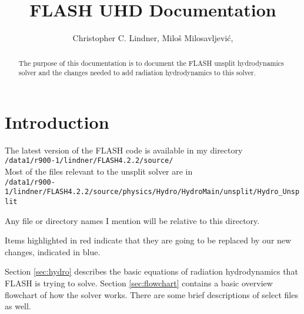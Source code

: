 \documentclass[preprint,11pt]{aastex}
\begin{document}
	

\title{FLASH UHD Documentation}
\author{
Christopher C. Lindner,
Milo\v s Milosavljevi\'c,
}


\begin{abstract}
The purpose of this documentation is to document the FLASH unsplit hydrodynamics solver and the changes needed to add radiation hydrodynamics to this solver.

\keywords{ }


\end{abstract}

\section{Introduction}
\label{sec:intro}
\setcounter{footnote}{0}

The latest version of the FLASH code is available in my directory \\
\verb!/data1/r900-1/lindner/FLASH4.2.2/source/! \\

Most of the files relevant to the unsplit solver are in \\
\verb!/data1/r900-1/lindner/FLASH4.2.2/source/physics/Hydro/HydroMain/unsplit/Hydro_Unsplit!

Any file or directory names I mention will be relative to this directory.

Items highlighted in {\color{red}red} indicate that they are going to be replaced by our new changes, indicated in {\color{blue}blue}.

Section \ref{sec:hydro} describes the basic equations of radiation hydrodynamics that FLASH is trying to solve.  Section \ref{sec:flowchart} contains a basic overview flowchart of how the solver works.  There are some brief descriptions of select files as well.
\end{document}
